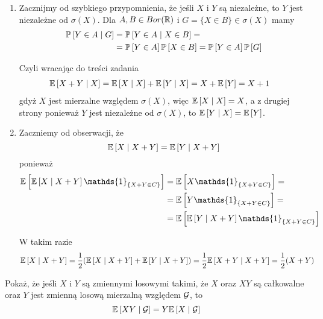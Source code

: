 \begin{solution}$ $

  \begin{enumerate}[label=(\alph*)]
    \item Zacznijmy od szybkiego przypomnienia, że jeśli $X$ i $Y$ są niezależne, to $Y$ jest niezależne od $\sigma(X)$. Dla $A, B\in Bor(\operatorname{\mathbb{R}})$ i $G=\{X\in B\}\in\sigma(X)$ mamy
  \begin{align*}
    \prob{Y\in A}{G}&=\prob{Y\in A}{X\in B}=\\ 
                    &=\prob{Y\in A}\prob{X\in B}=\prob{Y\in A}\prob{G}
  \end{align*}

  Czyli wracając do treści zadania
  \begin{align*}
    \expected{X+Y}{X}&=\expected{X}{X}+\expected{Y}{X}=X+\expected{Y}=X+1
  \end{align*}
  gdyż $X$ jest mierzalne względem $\sigma(X)$, więc $\expected{X}{X}=X$, a z drugiej strony ponieważ $Y$ jest niezależne od $\sigma(X)$, to $\expected{Y}{X}=\expected{Y}$.

  \item Zaczniemy od obserwacji, że
    $$\expected{X}{X+Y}=\expected{Y}{X+Y}$$
    ponieważ
    \begin{align*}
      \expected{ \expected{X}{X+Y} \mathds{1}_{\{X+Y\in C\}} } &=\expected{ X\mathds{1}_{\{X+Y\in C\}} }=\\ 
                                                               &=\expected{ Y\mathds{1}_{ \{X+Y\in C\} } }=\\ 
                                                               &=\expected{ \expected{Y}{X+Y}\mathds{1}_{\{X+Y\in C\}} }
    \end{align*}

    W takim razie 
    \begin{align*}
      \expected{X}{X+Y}&=\frac{1}{2}(\expected{X}{X+Y}+\expected{Y}{X+Y})=\frac{1}{2}\expected{X+Y}{X+Y}=\frac{1}{2}(X+Y)
    \end{align*}
\end{enumerate}
\end{solution}

\begin{problem}
  Pokaż, że jeśli $X$ i $Y$ są zmiennymi losowymi takimi, że $X$ oraz $XY$ są całkowalne oraz $Y$ jest zmienną losową mierzalną względem $\mathcal{G}$, to
  $$\expected{XY}{\set{G}}=Y\expected{X}{\set{G}}$$
\end{problem}

